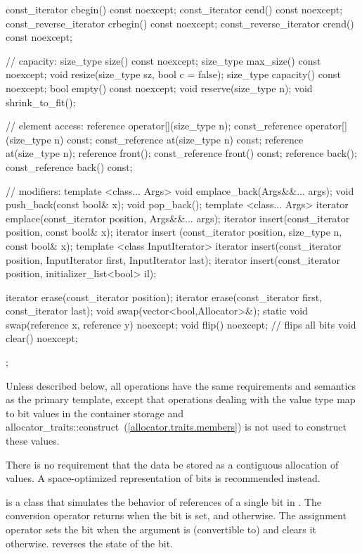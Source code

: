 \begin{codeblock}
{{    const_iterator         cbegin() const noexcept;
    const_iterator         cend() const noexcept;
    const_reverse_iterator crbegin() const noexcept;
    const_reverse_iterator crend() const noexcept;

    // capacity:
    size_type size() const noexcept;
    size_type max_size() const noexcept;
    void      resize(size_type sz, bool c = false);
    size_type capacity() const noexcept;
    bool      empty() const noexcept;
    void      reserve(size_type n);
    void      shrink_to_fit();

    // element access:
    reference       operator[](size_type n);
    const_reference operator[](size_type n) const;
    const_reference at(size_type n) const;
    reference       at(size_type n);
    reference       front();
    const_reference front() const;
    reference       back();
    const_reference back() const;

    // modifiers:
    template <class... Args> void emplace_back(Args&&... args);
    void push_back(const bool& x);
    void pop_back();
    template <class... Args> iterator emplace(const_iterator position, Args&&... args);
    iterator insert(const_iterator position, const bool& x);
    iterator insert (const_iterator position, size_type n, const bool& x);
    template <class InputIterator>
        iterator insert(const_iterator position,
                        InputIterator first, InputIterator last);
    iterator insert(const_iterator position, initializer_list<bool> il);

    iterator erase(const_iterator position);
    iterator erase(const_iterator first, const_iterator last);
    void swap(vector<bool,Allocator>&);
    static void swap(reference x, reference y) noexcept;
    void flip() noexcept;       // flips all bits
    void clear() noexcept;
  };
}
\end{codeblock}%

\pnum
Unless described below, all operations have the same requirements and
semantics as the primary  template, except that operations
dealing with the  value type map to bit values in the
container storage and
allocator_traits::construct~(\ref{allocator.traits.members}) is not used to
construct these values.

\pnum
There is no requirement that the data be stored as a contiguous allocation
of  values. A space-optimized representation of bits is
recommended instead.

\pnum
{}
is a class that simulates the behavior of references of a single bit in
. The conversion operator returns 
when the bit is set, and  otherwise. The assignment operator
sets the bit when the argument is (convertible to)  and
clears it otherwise.  reverses the state of the bit.

